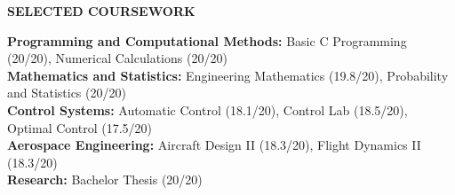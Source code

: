 \documentclass[12pt]{article}
\begin{document}
\vspace{8pt}

\begin{center}
	{\noindent \bfseries SELECTED COURSEWORK}
\end{center}

\vspace{-4pt}

\noindent
\textbf{Programming and Computational Methods:} Basic C Programming (20/20), Numerical Calculations (20/20) \\
\textbf{Mathematics and Statistics:} Engineering Mathematics (19.8/20), Probability and Statistics (20/20) \\
\textbf{Control Systems:} Automatic Control (18.1/20), Control Lab (18.5/20), Optimal Control (17.5/20) \\
\textbf{Aerospace Engineering:} Aircraft Design II (18.3/20), Flight Dynamics II (18.3/20) \\
\textbf{Research:} Bachelor Thesis (20/20)

\end{document}
